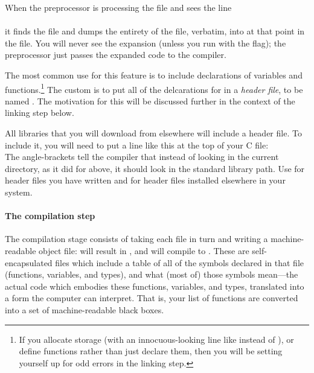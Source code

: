 \documentclass[12pt]{article}
\def\ind#1{\index{#1}#1}
\begin{document}
When the preprocessor is processing the file  and sees the line\\
\\
it finds the file  and dumps the entirety of the file,
verbatim, into  at that point in the file. You will
never see the expansion (unless you run  with the  flag); the
preprocessor just passes the expanded code to the compiler.

The most common use for this feature is to include declarations of variables
and functions.\footnote{If you allocate storage (with an innocuous-looking
line like  instead of ), or define
functions rather than just declare them, then you will be setting
yourself up for odd errors in the linking step.} The custom is to put all
of the delcarations for  in a {\sl \ind{header
file}}, to be named .  The motivation for
this will be discussed further in the context of the linking step below.

All libraries that you will download from elsewhere will include a header file.
To include it, you will need to put a line like this at the top of your C file:
\\
The angle-brackets tell the compiler that instead of looking in the
current directory, as it did for  above, it should
look in the standard library path. Use  for header
files you have written and  for header files
installed elsewhere in your system.  

\paragraph{The compilation step} 
The \ind{compilation}
stage consists of taking each  file in turn and
writing a machine-readable object file:  will
result in , and  will compile to
. These  are self-encapsulated
files which include a table of all of the symbols declared in that file
(functions, variables, and types), and what (most of) those symbols
mean---the actual code which embodies these functions, variables, and
types, translated into a form the computer can interpret. That is, your
list of functions are converted into a set of machine-readable black
boxes.
\end{document}
